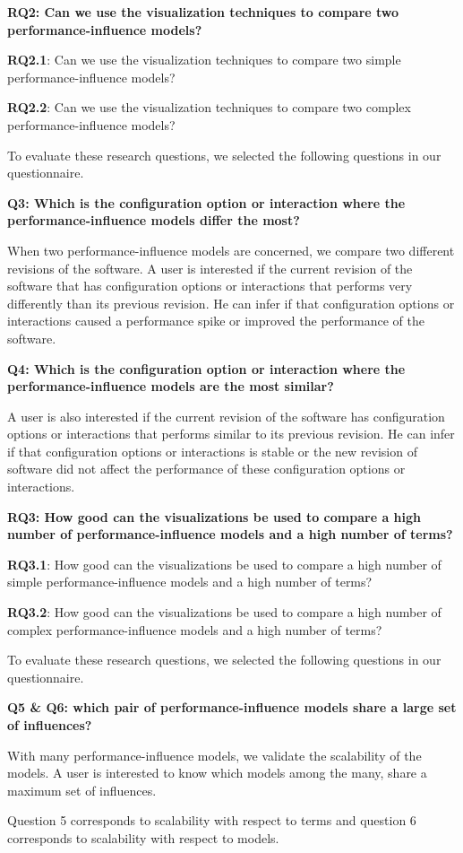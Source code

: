 \textbf{RQ2: Can we use the visualization techniques to compare two performance-influence models?}

\begin{myindentpar}{0.5cm}
\textbf{RQ2.1}: Can we use the visualization techniques to compare two simple performance-influence models?

\textbf{RQ2.2}: Can we use the visualization techniques to compare two complex performance-influence models?

To evaluate these research questions, we selected the following questions in our questionnaire.

\textbf{Q3: Which is the configuration option or interaction where the performance-influence models differ the most?}

When two performance-influence models are concerned, we compare two different revisions of the software. A user is interested if the current revision of the software that has configuration options or interactions that performs very differently than its previous revision. He can infer if that configuration options or interactions caused a performance spike or improved the performance of the software.

\textbf{Q4: Which is the configuration option or interaction where the performance-influence models are the most similar?}

A user is also interested if the current revision of the software has configuration options or interactions that performs similar to its previous revision. He can infer if that configuration options or interactions is stable or the new revision of software did not affect the performance of these configuration options or interactions.
\end{myindentpar}

\textbf{RQ3: How good can the visualizations be used to compare a high number of performance-influence models and a high number of terms?}

\begin{myindentpar}{0.5cm}

\textbf{RQ3.1}: How good can the visualizations be used to compare a high number of simple performance-influence models and a high number of terms?

\textbf{RQ3.2}: How good can the visualizations be used to compare a high number of complex performance-influence models and a high number of terms?

To evaluate these research questions, we selected the following questions in our questionnaire.

\textbf{Q5 \& Q6: which pair of performance-influence models share a large set of influences?}

With many performance-influence models, we validate the scalability of the models. A user is interested to know which models among the many, share a maximum set of influences. 

Question 5 corresponds to scalability with respect to terms and question 6 corresponds to scalability with respect to models.
\end{myindentpar}

